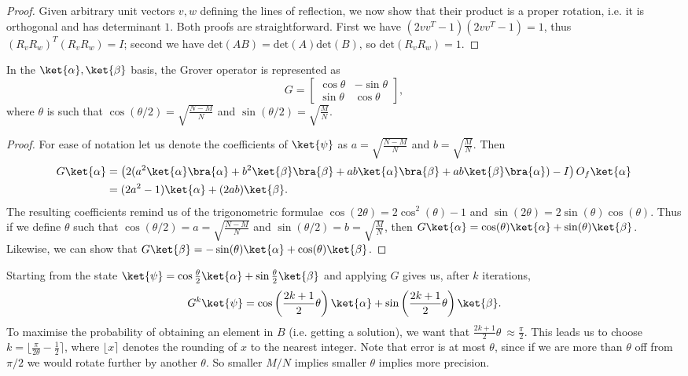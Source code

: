 \begin{enumerate}
\begin{proof}
        Given arbitrary unit vectors $v,w$ defining the lines of reflection, we now show that their product is a proper rotation, i.e. it is orthogonal and has determinant $1$. Both proofs are straightforward. First we have $(2vv^T-1)(2vv^T-1) = 1$, thus $(R_vR_w)^T (R_vR_w) = I$; second we have $\text{det}(AB) = \text{det}(A)\text{det}(B)$, so $\text{det}(R_vR_w) = 1$.
    \end{proof}

    \begin{proposition}
        In the $\ket{\alpha},\ket{\beta}$ basis, the Grover operator is represented as
        \[
            G = 
            \begin{bmatrix}
                \cos \theta & -\sin \theta\\
                \sin \theta &
                \cos \theta
            \end{bmatrix},
        \]
        where $\theta$ is such that $\cos(\theta/2) = \sqrt{\frac{N-M}{N}}$ and $\sin(\theta/2) = \sqrt{\frac{M}{N}}$.
    \end{proposition}
    \begin{proof}
        For ease of notation let us denote the coefficients of $\ket{\psi}$ as $a=\sqrt{\frac{N-M}{N}}$ and $b=\sqrt{\frac{M}{N}}$. Then
        \begin{align*}
            G\ket{\alpha} &= \left( 2(a^2\ket{\alpha}\bra{\alpha} + b^2\ket{\beta}\bra{\beta} + ab\ket{\alpha}\bra{\beta} + ab\ket{\beta}\bra{\alpha}) - I \right)O_f\ket{\alpha}\\
            &= (2a^2-1)\ket{\alpha} + (2ab)\ket{\beta}.
        \end{align*}
        The resulting coefficients remind us of the trigonometric formulae $\cos(2\theta) = 2\cos^2(\theta)-1$ and $\sin(2\theta) = 2\sin(\theta)\cos(\theta)$. Thus if we define $\theta$ such that $\cos(\theta/2) = a = \sqrt{\frac{N-M}{N}}$ and $\sin(\theta/2) = b = \sqrt{\frac{M}{N}}$, then $G\ket{\alpha} = \cos(\theta)\ket{\alpha} + \sin(\theta)\ket{\beta}$. Likewise, we can show that $G\ket{\beta} = -\sin(\theta)\ket{\alpha} + \cos(\theta)\ket{\beta}$.
    \end{proof}

    Starting from the state $\ket{\psi} = \cos\frac{\theta}{2}\ket{\alpha} + \sin\frac{\theta}{2}\ket{\beta}$ and applying $G$ gives us, after $k$ iterations,
    \[
        G^k\ket{\psi} = \cos\left( \frac{2k+1}{2}\theta\right)\ket{\alpha} + \sin\left( \frac{2k+1}{2}\theta\right)\ket{\beta}.
    \]
    To maximise the probability of obtaining an element in $B$ (i.e. getting a solution), we want that $\frac{2k+1}{2}\theta\ \approx \frac{\pi}{2}$. This leads us to choose $k = \lfloor \frac{\pi}{2\theta} - \frac{1}{2} \rceil$, where $\lfloor x \rceil$ denotes the rounding of $x$ to the nearest integer. Note that error is at most $\theta$, since if we are more than $\theta$ off from $\pi/2$ we would rotate further by another $\theta$. So smaller $M/N$ implies smaller $\theta$ implies more precision.


\end{enumerate}
